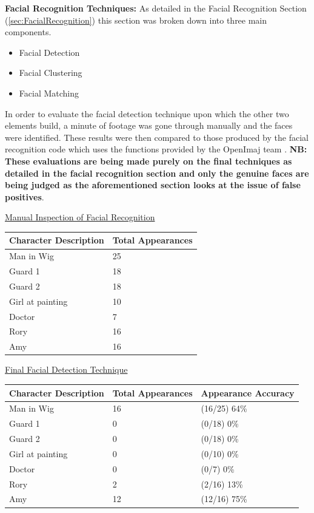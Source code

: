 \textbf{Facial Recognition Techniques:}
As detailed in the Facial Recognition Section (\ref{sec:FacialRecognition}) this section was broken down into three main components.

\begin{itemize}
	\item{Facial Detection}
	\item{Facial Clustering}
	\item{Facial Matching}
\end{itemize}

In order to evaluate the facial detection technique upon which the other two elements build, a minute of footage was gone through manually and the faces were identified. These results were then compared to those produced by the facial recognition code which uses the functions provided by the OpenImaj team \cite{citeOpenImaj}. \textbf{NB: These evaluations are being made purely on the final techniques as detailed in the facial recognition section and only the genuine faces are being judged as the aforementioned section looks at the issue of false positives}.

\underline{Manual Inspection of Facial Recognition}

\begin{center}
\begin{tabular}{|p{201pt}|p{201pt}|}
\hline
\textbf{Character Description} 	& \textbf{Total Appearances} 	\\\hline
Man in Wig			&25				\\\hline
Guard 1				&18					\\\hline
Guard 2				&18					\\\hline
Girl at painting			&10					\\\hline
Doctor				&7					\\\hline
Rory					&16					\\\hline
Amy					&16					\\\hline
\end{tabular}
\end{center}

\underline{Final Facial Detection Technique}
\begin{center}
\begin{tabular}{|p{160pt}|p{100pt}|p{134pt}|}
\hline
\textbf{Character Description} 	& \textbf{Total Appearances} 	&\textbf{Appearance Accuracy}	\\\hline
Man in Wig			&16					&(16/25) 64\%				\\\hline
Guard 1				&0					&(0/18) 0\%				\\\hline
Guard 2				&0					&(0/18) 0\%				\\\hline
Girl at painting			&0					&(0/10) 0\%				\\\hline
Doctor				&0					&(0/7) 0\%				\\\hline
Rory					&2					&(2/16) 13\%				\\\hline
Amy					&12					&(12/16) 75\%				\\\hline
\end{tabular}
\end{center}

